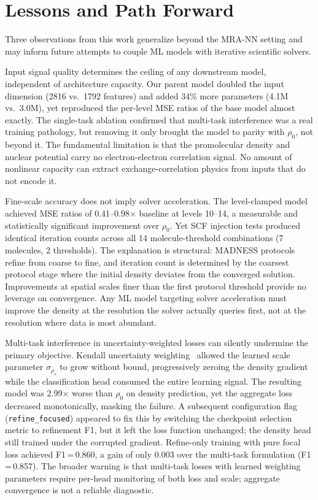 \section{Lessons and Path Forward}
\label{sec:lessons}

Three observations from this work generalize beyond the MRA-NN setting
and may inform future attempts to couple ML models with iterative
scientific solvers.

Input signal quality determines the ceiling of any downstream model,
independent of architecture capacity. Our parent model doubled the
input dimension (2816 vs.\ 1792 features) and added 34\% more
parameters (4.1M vs.\ 3.0M), yet reproduced the per-level MSE ratios
of the base model almost exactly. The single-task ablation confirmed
that multi-task interference was a real training pathology, but
removing it only brought the model to parity with $\rho_0$, not beyond
it. The fundamental limitation is that the promolecular density and
nuclear potential carry no electron-electron correlation signal. No
amount of nonlinear capacity can extract exchange-correlation physics
from inputs that do not encode it.

Fine-scale accuracy does not imply solver acceleration. The level-clamped
model achieved MSE ratios of 0.41--0.98$\times$ baseline at levels
10--14, a measurable and statistically significant improvement over
$\rho_0$. Yet SCF injection tests produced identical iteration counts
across all 14 molecule-threshold combinations (7 molecules, 2
thresholds). The explanation is structural: MADNESS
protocols~\cite{harrison2016madness} refine from coarse to fine,
and iteration count is determined by the coarsest protocol stage
where the initial density deviates from the converged solution.
Improvements at spatial scales finer than the first protocol
threshold provide no leverage on convergence. Any ML model targeting
solver acceleration must improve the density at the resolution the
solver actually queries first, not at the resolution where data is
most abundant.

Multi-task interference in uncertainty-weighted losses can silently
undermine the primary objective. Kendall uncertainty
weighting~\cite{kendall2018multitask} allowed the learned scale
parameter $\sigma_{\rho_s}$ to grow without bound, progressively
zeroing the density gradient while the classification head consumed
the entire learning signal. The resulting model was 2.99$\times$
worse than $\rho_0$ on density prediction, yet the aggregate loss
decreased monotonically, masking the failure. A subsequent
configuration flag (\texttt{refine\_focused}) appeared to fix this
by switching the checkpoint selection metric to refinement F1, but it
left the loss function unchanged; the density head still trained under
the corrupted gradient. Refine-only training with pure focal loss
achieved F1\,=\,0.860, a gain of only 0.003 over the multi-task
formulation (F1\,=\,0.857). The broader warning is that multi-task
losses with learned weighting parameters require per-head monitoring
of both loss and scale; aggregate convergence is not a reliable
diagnostic.


